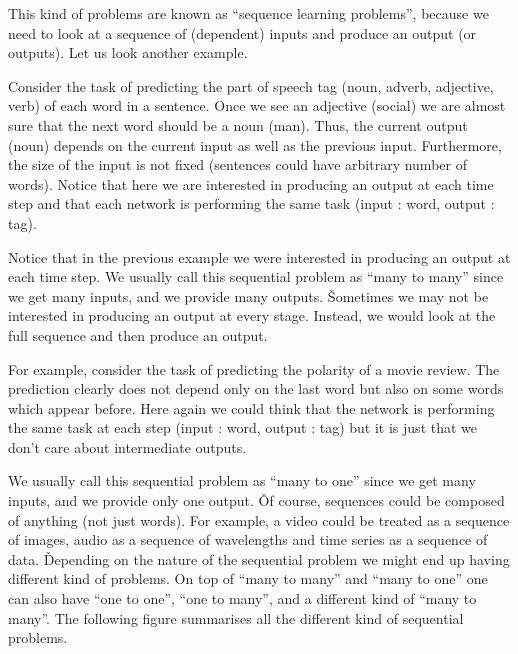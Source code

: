 \ee

This kind of problems are known as ``sequence learning problems'', because we need to look at a sequence of
(dependent) inputs and produce an output (or outputs). Let us look another example.

\be
Consider the task of predicting the part of speech tag (noun, adverb, adjective, verb) of each word in a sentence.
Once we see an adjective (social) we are almost sure that the next word should be a noun (man). Thus, the current
output (noun) depends on the current input as well as the previous input. Furthermore, the size of the input is not
fixed (sentences could have arbitrary number of words). Notice that here we are interested in producing an output at
each time step and that each network is performing the same task (input : word, output : tag).

\ee

Notice that in the previous example we were interested in producing an output at each time step. We usually call this
sequential problem as ``many to many'' since we get many inputs, and we provide many outputs. \v

Sometimes we may not be interested in producing an output at every stage. Instead, we would look at the full sequence
and then produce an output.

\be
For example, consider the task of predicting the polarity of a movie review. The prediction clearly does not depend
only on the last word but also on some words which appear before. Here again we could think that the network is
performing the same task at each step (input : word, output : tag) but it is just that we don't care about
intermediate outputs.

\vspace{-10pt}


\vspace{-10pt}
\ee

We usually call this sequential problem as ``many to one'' since we get many inputs, and we provide only one output. \v

Of course, sequences could be composed of anything (not just words). For example, a video could be treated as a
sequence of images, audio as a sequence of wavelengths and time series as a sequence of data. \v

Depending on the nature of the sequential problem we might end up having different kind of problems. On top of ``many
to many'' and ``many to one'' one can also have ``one to one'', ``one to many'', and a different kind of ``many to
many''. The following figure summarises all the different kind of sequential problems.

